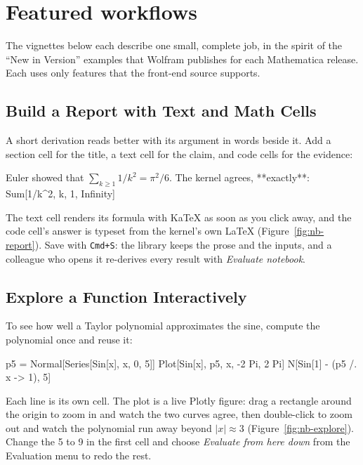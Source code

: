 \section{Featured workflows}
\label{sec:nb-featured}

The vignettes below each describe one small, complete job, in the spirit of
the ``New in Version'' examples that Wolfram publishes for each Mathematica
release. Each uses only features that the front-end source supports.

\subsection*{Build a Report with Text and Math Cells}

A short derivation reads better with its argument in words beside it. Add a
section cell for the title, a text cell for the claim, and code cells for the
evidence:

\begin{shell}
Euler showed that $\sum_{k\ge 1} 1/k^2 = \pi^2/6$. The kernel agrees, **exactly**:
Sum[1/k^2, {k, 1, Infinity}]
\end{shell}

\noindent The text cell renders its formula with KaTeX as soon as you click
away, and the code cell's answer is typeset from the kernel's own \LaTeX{}
(Figure~\ref{fig:nb-report}). Save with \texttt{Cmd+S}: the library keeps the
prose and the inputs, and a colleague who opens it re-derives every result
with \emph{Evaluate notebook}.

\subsection*{Explore a Function Interactively}

To see how well a Taylor polynomial approximates the sine, compute the
polynomial once and reuse it:

\begin{shell}
p5 = Normal[Series[Sin[x], {x, 0, 5}]]
Plot[{Sin[x], p5}, {x, -2 Pi, 2 Pi}]
N[Sin[1] - (p5 /. x -> 1), 5]
\end{shell}

\noindent Each line is its own cell. The plot is a live Plotly figure: drag a
rectangle around the origin to zoom in and watch the two curves agree, then
double-click to zoom out and watch the polynomial run away beyond
\(|x| \approx 3\) (Figure~\ref{fig:nb-explore}). Change the 5 to 9 in the
first cell and choose \emph{Evaluate from here down} from the Evaluation menu
to redo the rest.

